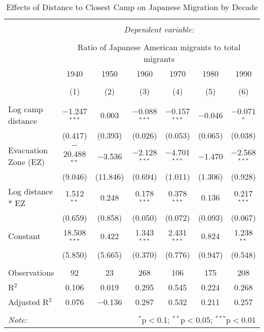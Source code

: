 
\begin{table}[!htbp] \centering 
  \caption{Effects of Distance to Closest Camp on Japanese Migration by Decade} 
  \label{} 
\begin{tabular}{@{\extracolsep{5pt}}lcccccc} 
\\[-1.8ex]\hline 
\hline \\[-1.8ex] 
 & \multicolumn{6}{c}{\textit{Dependent variable:}} \\ 
\cline{2-7} 
\\[-1.8ex] & \multicolumn{6}{c}{Ratio of Japanese American migrants to total migrants} \\ 
 & 1940 & 1950 & 1960 & 1970 & 1980 & 1990 \\ 
\\[-1.8ex] & (1) & (2) & (3) & (4) & (5) & (6)\\ 
\hline \\[-1.8ex] 
 Log camp distance & $-$1.247$^{***}$ & 0.003 & $-$0.088$^{***}$ & $-$0.157$^{***}$ & $-$0.046 & $-$0.071$^{*}$ \\ 
  & (0.417) & (0.393) & (0.026) & (0.053) & (0.065) & (0.038) \\ 
  Evacuation Zone (EZ) & $-$20.488$^{**}$ & $-$3.536 & $-$2.128$^{***}$ & $-$4.701$^{***}$ & $-$1.470 & $-$2.568$^{***}$ \\ 
  & (9.046) & (11.846) & (0.694) & (1.011) & (1.306) & (0.928) \\ 
  Log distance * EZ  & 1.512$^{**}$ & 0.248 & 0.178$^{***}$ & 0.378$^{***}$ & 0.136 & 0.217$^{***}$ \\ 
  & (0.659) & (0.858) & (0.050) & (0.072) & (0.093) & (0.067) \\ 
  Constant & 18.508$^{***}$ & 0.422 & 1.343$^{***}$ & 2.431$^{***}$ & 0.824 & 1.238$^{**}$ \\ 
  & (5.850) & (5.665) & (0.370) & (0.776) & (0.947) & (0.548) \\ 
 \hline \\[-1.8ex] 
Observations & 92 & 23 & 268 & 106 & 175 & 208 \\ 
R$^{2}$ & 0.106 & 0.019 & 0.295 & 0.545 & 0.224 & 0.268 \\ 
Adjusted R$^{2}$ & 0.076 & $-$0.136 & 0.287 & 0.532 & 0.211 & 0.257 \\ 
\hline 
\hline \\[-1.8ex] 
\textit{Note:}  & \multicolumn{6}{r}{$^{*}$p$<$0.1; $^{**}$p$<$0.05; $^{***}$p$<$0.01} \\ 
\end{tabular} 
\end{table} 
